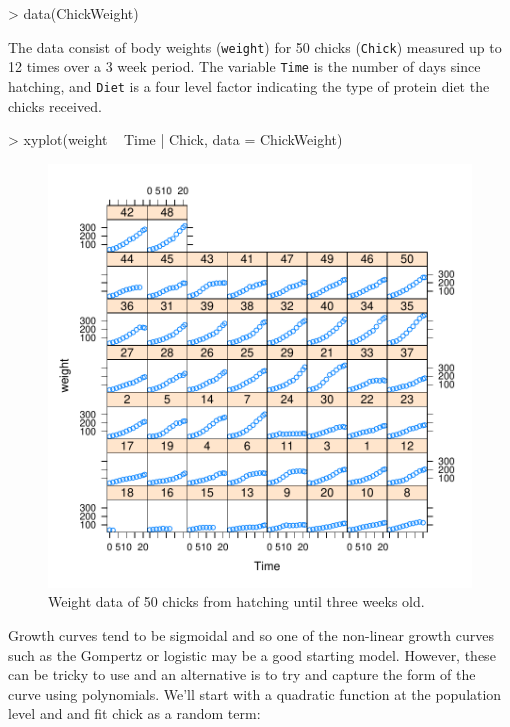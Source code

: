 \documentclass{article}
\begin{document}
\begin{Schunk}
\begin{Sinput}
> data(ChickWeight)
\end{Sinput}
\end{Schunk}

The data consist of body weights (\texttt{weight}) for 50 chicks (\texttt{Chick}) measured up to 12 times over a 3 week period. The variable \texttt{Time} is the number of days since hatching, and \texttt{Diet} is a four level factor indicating the type of protein diet the chicks received.

\begin{Schunk}
\begin{Sinput}
> xyplot(weight ~ Time | Chick, data = ChickWeight)
\end{Sinput}
\end{Schunk}


\begin{figure}[!h]
\begin{center}
\includegraphics{Lecture4-005}
\end{center}
\caption{Weight data of 50 chicks from hatching until three weeks old.}
\label{ChickWeight-fig}
\end{figure}

Growth curves tend to be sigmoidal and so one of the non-linear growth curves such as the Gompertz or logistic may be a good starting model. However, these can be tricky to use and an alternative is to try and capture the form of the curve using polynomials. We'll start with a quadratic function at the population level and and fit chick as a random term:
\end{document}

